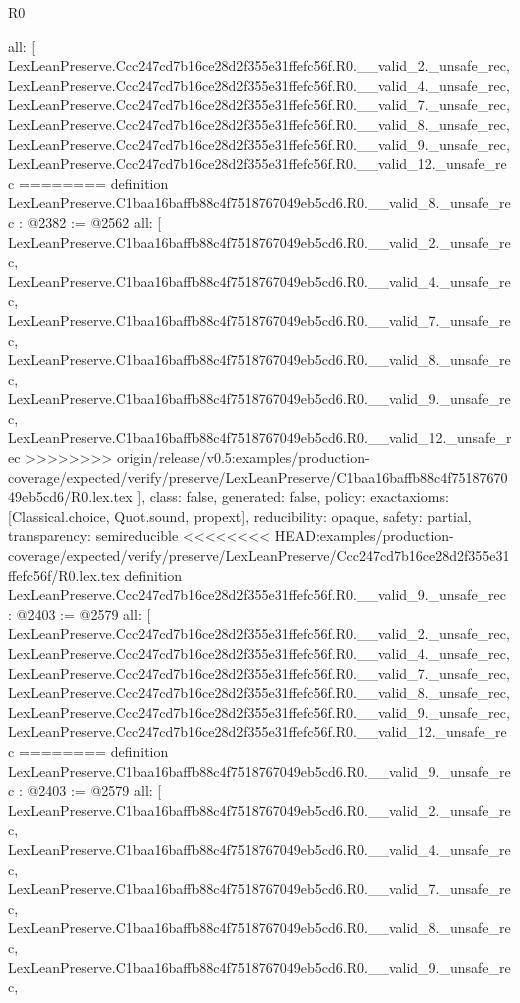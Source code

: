 \begin{lexlean}{R0}
\begin{coremodule}
{{{{{{{{{{{{{{{{{{{{{{{{{{{{{{{{{{{{{{{{{{{{{{{{{{{{{  all: [
    LexLeanPreserve.Ccc247cd7b16ce28d2f355e31ffefc56f.R0.__valid_2._unsafe_rec,
    LexLeanPreserve.Ccc247cd7b16ce28d2f355e31ffefc56f.R0.__valid_4._unsafe_rec,
    LexLeanPreserve.Ccc247cd7b16ce28d2f355e31ffefc56f.R0.__valid_7._unsafe_rec,
    LexLeanPreserve.Ccc247cd7b16ce28d2f355e31ffefc56f.R0.__valid_8._unsafe_rec,
    LexLeanPreserve.Ccc247cd7b16ce28d2f355e31ffefc56f.R0.__valid_9._unsafe_rec,
    LexLeanPreserve.Ccc247cd7b16ce28d2f355e31ffefc56f.R0.__valid_12._unsafe_rec
========
definition LexLeanPreserve.C1baa16baffb88c4f7518767049eb5cd6.R0.__valid_8._unsafe_rec : @2382 := @2562 {
  all: [
    LexLeanPreserve.C1baa16baffb88c4f7518767049eb5cd6.R0.__valid_2._unsafe_rec,
    LexLeanPreserve.C1baa16baffb88c4f7518767049eb5cd6.R0.__valid_4._unsafe_rec,
    LexLeanPreserve.C1baa16baffb88c4f7518767049eb5cd6.R0.__valid_7._unsafe_rec,
    LexLeanPreserve.C1baa16baffb88c4f7518767049eb5cd6.R0.__valid_8._unsafe_rec,
    LexLeanPreserve.C1baa16baffb88c4f7518767049eb5cd6.R0.__valid_9._unsafe_rec,
    LexLeanPreserve.C1baa16baffb88c4f7518767049eb5cd6.R0.__valid_12._unsafe_rec
>>>>>>>> origin/release/v0.5:examples/production-coverage/expected/verify/preserve/LexLeanPreserve/C1baa16baffb88c4f7518767049eb5cd6/R0.lex.tex
  ],
  class: false,
  generated: false,
  policy: exact{axioms: [Classical.choice, Quot.sound, propext]},
  reducibility: opaque{},
  safety: partial,
  transparency: semireducible
}
<<<<<<<< HEAD:examples/production-coverage/expected/verify/preserve/LexLeanPreserve/Ccc247cd7b16ce28d2f355e31ffefc56f/R0.lex.tex
definition LexLeanPreserve.Ccc247cd7b16ce28d2f355e31ffefc56f.R0.__valid_9._unsafe_rec : @2403 := @2579 {
  all: [
    LexLeanPreserve.Ccc247cd7b16ce28d2f355e31ffefc56f.R0.__valid_2._unsafe_rec,
    LexLeanPreserve.Ccc247cd7b16ce28d2f355e31ffefc56f.R0.__valid_4._unsafe_rec,
    LexLeanPreserve.Ccc247cd7b16ce28d2f355e31ffefc56f.R0.__valid_7._unsafe_rec,
    LexLeanPreserve.Ccc247cd7b16ce28d2f355e31ffefc56f.R0.__valid_8._unsafe_rec,
    LexLeanPreserve.Ccc247cd7b16ce28d2f355e31ffefc56f.R0.__valid_9._unsafe_rec,
    LexLeanPreserve.Ccc247cd7b16ce28d2f355e31ffefc56f.R0.__valid_12._unsafe_rec
========
definition LexLeanPreserve.C1baa16baffb88c4f7518767049eb5cd6.R0.__valid_9._unsafe_rec : @2403 := @2579 {
  all: [
    LexLeanPreserve.C1baa16baffb88c4f7518767049eb5cd6.R0.__valid_2._unsafe_rec,
    LexLeanPreserve.C1baa16baffb88c4f7518767049eb5cd6.R0.__valid_4._unsafe_rec,
    LexLeanPreserve.C1baa16baffb88c4f7518767049eb5cd6.R0.__valid_7._unsafe_rec,
    LexLeanPreserve.C1baa16baffb88c4f7518767049eb5cd6.R0.__valid_8._unsafe_rec,
    LexLeanPreserve.C1baa16baffb88c4f7518767049eb5cd6.R0.__valid_9._unsafe_rec,
}}}}}}}}}}}}}}}}}}}}}}}}}}}}}}}}}}}}}}}}}}}}}}}}}}}}}}}
\end{coremodule}
\end{lexlean}
